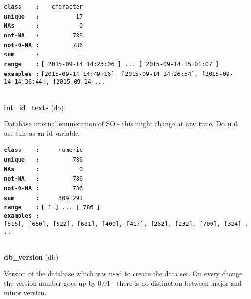 \documentclass[]{article}
\begin{document}
\textbf{\texttt{class\ \ \ \ :}} \texttt{~~~character}\\
\textbf{\texttt{unique\ \ \ :}} \texttt{~~~~~~~~~~17}\\
\textbf{\texttt{NAs\ \ \ \ \ \ :}} \texttt{~~~~~~~~~~~0}\\
\textbf{\texttt{not-NA\ \ \ :}} \texttt{~~~~~~~~~786}\\
\textbf{\texttt{not-0-NA\ :}} \texttt{~~~~~~~~~786}\\
\textbf{\texttt{sum\ \ \ \ \ \ :}} \texttt{~~~~~~~~~~~-}\\
\textbf{\texttt{range\ \ \ \ :}}
\texttt{{[}\ 2015-09-14\ 14:23:06\ {]}\ ...\ {[}\ 2015-09-14\ 15:01:07\ {]}}\\
\textbf{\texttt{examples\ :}}
\texttt{{[}2015-09-14\ 14:49:16{]},\ {[}2015-09-14\ 14:26:54{]},\ {[}2015-09-14\ 14:36:44{]},\ {[}2015-09-14\ ...}\\

~

\textbf{int\_id\_texts} (db)

Database internal enumeration of SO - this might change at any time. Do
\textbf{not} use this as an id variable.

\textbf{\texttt{class\ \ \ \ :}} \texttt{~~~~~numeric}\\
\textbf{\texttt{unique\ \ \ :}} \texttt{~~~~~~~~~786}\\
\textbf{\texttt{NAs\ \ \ \ \ \ :}} \texttt{~~~~~~~~~~~0}\\
\textbf{\texttt{not-NA\ \ \ :}} \texttt{~~~~~~~~~786}\\
\textbf{\texttt{not-0-NA\ :}} \texttt{~~~~~~~~~786}\\
\textbf{\texttt{sum\ \ \ \ \ \ :}} \texttt{~~~~~309~291}\\
\textbf{\texttt{range\ \ \ \ :}}
\texttt{{[}\ 1\ {]}\ ...\ {[}\ 786\ {]}}\\
\textbf{\texttt{examples\ :}}
\texttt{{[}515{]},\ {[}650{]},\ {[}522{]},\ {[}681{]},\ {[}409{]},\ {[}417{]},\ {[}262{]},\ {[}232{]},\ {[}700{]},\ {[}324{]}\ ...}\\

~

\textbf{db\_version} (db)

Version of the database which was used to create the data set. On every
change the version number goes up by 0.01 - there is no distinction
between major and minor version.
\end{document}
